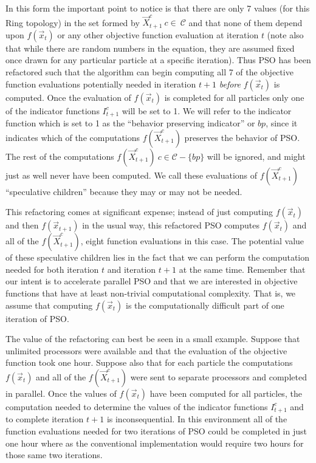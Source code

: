 \documentclass[journal,letterpaper]{IEEEtran}
\providecommand{\ppos}{\ensuremath{\Vec{x}}}
\providecommand{\ofunc}{\ensuremath{f}}
\providecommand{\indic}{\ensuremath{I}}
\providecommand{\specpos}{\ensuremath{\vec{X}}}
\providecommand{\caseset}{\ensuremath{\mathcal{C}}}
\begin{document}
In this form the important point to notice is that there are only 7 values (for
this Ring topology) in the set formed by $\specpos_{t+1}^{c} \ c \in\ \caseset$
and that none of them depend upon $f(\ppos_t)$ or any other objective function
evaluation at iteration $t$ (note also that while there are random numbers in
the equation, they are assumed fixed once drawn for any particular particle at
a specific iteration).  Thus PSO has been refactored such that the algorithm
can begin computing all 7 of the objective function evaluations potentially
needed in iteration $t+1$ \emph{before} $f(\ppos_t)$ is computed.  Once the
evaluation of $f(\ppos_{t})$ is completed for all particles only one of the
indicator functions $\indic_{t+1}^{c}$ will be set to 1.  We will refer to
the indicator function which is set to 1 as the ``behavior preserving
indicator'' or $bp$, since it indicates which of the computations
$\ofunc(\specpos_{t+1}^{c})$ preserves the behavior of PSO.  The rest of the
computations $\ofunc(\specpos_{t+1}^{c}) \ c \in \caseset-\{bp\}$ will be
ignored, and might just as well never have been computed.  We call these
evaluations of $\ofunc(\specpos_{t+1}^{c})$ ``speculative children'' because
they may or may not be needed.

This refactoring comes at significant expense; instead of just computing
$\ofunc(\ppos_{t})$ and then $\ofunc(\ppos_{t+1})$ in the usual way, this
refactored PSO computes $\ofunc(\ppos_{t})$ and all of the
$\ofunc(\specpos_{t+1}^{c})$, eight function evaluations in this case.  The
potential value of these speculative children lies in the fact that we can
perform the computation needed for both iteration $t$ and iteration $t+1$ at
the same time.  Remember that our intent is to accelerate parallel PSO and that
we are interested in objective functions that have at least non-trivial
computational complexity.  That is, we assume that computing
$\ofunc(\ppos_{t})$ is the computationally difficult part of one iteration of
PSO.

The value of the refactoring can best be seen in a small example.  Suppose that
unlimited processors were available and that the evaluation of the objective
function took one hour. Suppose also that for each particle the computations
$\ofunc(\ppos_{t})$ and all of the $\ofunc(\specpos_{t+1}^{c})$ were sent to
separate processors and completed in parallel.  Once the values of
$\ofunc(\ppos_{t})$ have been computed for all particles, the computation
needed to determine the values of the indicator functions $\indic_{t+1}^{c}$
and to complete iteration $t+1$ is inconsequential.  In this environment all of
the function evaluations needed for two iterations of PSO could be completed in
just one hour where as the conventional implementation would require two hours
for those same two iterations.
\end{document}
